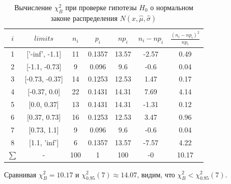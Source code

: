 \documentclass[a4paper]{article}
\begin{document}
\begin{table}[H]
	\centering
	\begin{tabular}{| c | c | c | c | c | c | c |}
	\hline
   $i$ & $limits$         &   $n_i$ &    $p_i$ &   $np_i$ &   $n_i - np_i$ &   $\frac{(n_i-np_i)^2}{np_i}$ \\
\hline
   1 & ['-inf', -1.1] &    11 & 0.1357 &  13.57 &        -2.57 &                        0.49 \\
   2 & [-1.1, -0.73]  &     9 & 0.096  &   9.6  &        -0.6  &                        0.04 \\
   3 & [-0.73, -0.37] &    14 & 0.1253 &  12.53 &         1.47 &                        0.17 \\
   4 & [-0.37, 0.0]   &    22 & 0.1431 &  14.31 &         7.69 &                        4.14 \\
   5 & [0.0, 0.37]    &    13 & 0.1431 &  14.31 &        -1.31 &                        0.12 \\
   6 & [0.37, 0.73]   &    16 & 0.1253 &  12.53 &         3.47 &                        0.96 \\
   7 & [0.73, 1.1]    &     9 & 0.096  &   9.6  &        -0.6  &                        0.04 \\
   8 & [1.1, 'inf']   &     6 & 0.1357 &  13.57 &        -7.57 &                        4.22 \\
   $\sum$ & -             &   100 & 1      & 100    &        -0    &                       10.17 \\
\hline
\end{tabular}
	\caption{ Вычисление $\chi^{2}_{B}$ при проверке гипотезы $H_{0}$ о нормальном законе распределения $N(x,\hat{\mu}, \hat{\sigma})$}
	\label{tab:normal_chi_2}
\end{table} 

\noindent Сравнивая $\chi^{2}_{B} = 10.17$ и $\chi^{2}_{0.95}(7) \approx 14.07$, видим, что $\chi^{2}_{B} < \chi^{2}_{0.95}(7)$.
\\
\end{document}
